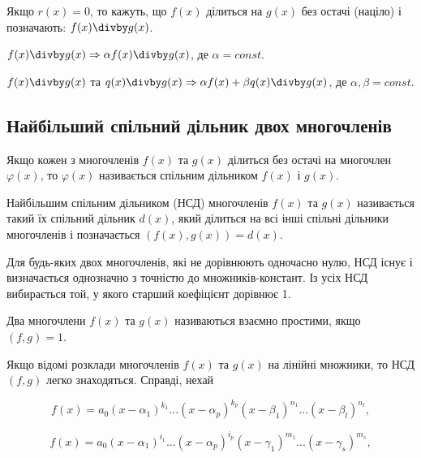 \begin{remark}
    Якщо $r(x) = 0$, то кажуть, що $f(x)$ ділиться на $g(x)$ без остачі (націло)
    і позначають: $f(x) \divby g(x)$.
\end{remark}

\begin{claim}
	$f(x) \divby g(x) \Rightarrow \alpha f(x) \divby g(x)$, де $\alpha = const$.
\end{claim}

\begin{claim}
	$f(x) \divby g(x)$ та $q(x) \divby g(x) \Rightarrow \alpha f(x) + \beta q(x) \divby g(x)$,
	де $\alpha, \beta = const$. 
\end{claim}

\subsection{Найбільший спільний дільник двох многочленів}

\begin{definition}
	Якщо кожен з многочленів $f(x)$ та $g(x)$ ділиться без остачі на
	многочлен $\varphi(x)$, то $\varphi(x)$ називається спільним дільником $f(x)$ і $g(x)$.
\end{definition}

\begin{definition}
	Найбільшим спільним дільником (НСД) многочленів $f(x)$ та $g(x)$
	називається такий їх спільний дільник $d(x)$, який ділиться на всі інші спільні
	дільники многочленів і позначається $(f(x),g(x)) = d(x)$.
\end{definition}

Для будь-яких двох многочленів, які не дорівнюють одночасно нулю, НСД
існує і визначається однозначно з точністю до множників-констант. Із усіх НСД
вибирається той, у якого старший коефіцієнт дорівнює 1.

\begin{definition} 
	Два многочлени $f(x)$ та $g(x)$ називаються взаємно простими, якщо $(f,g) = 1$.
\end{definition}

Якщо відомі розклади многочленів $f(x)$ та $g(x)$ на лінійні множники, то НСД
$(f,g)$ легко знаходяться. Справді, нехай

$$f(x) = a_0(x-\alpha_{1})^{k_1}...(x-\alpha_{p})^{k_p}(x-\beta_{1})^{n_1}...(x-\beta_{l})^{n_l},$$

$$f(x) = a_0(x-\alpha_{1})^{i_1}...(x-\alpha_{p})^{i_p}(x-\gamma_{1})^{m_1}...(x-\gamma_{s})^{m_s},$$


